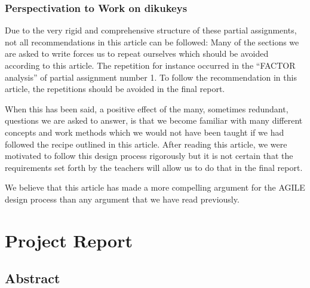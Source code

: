 \documentclass[11pt,a4paper]{report}
\begin{document}
\subsection{Perspectivation to Work on dikukeys}
Due to the very rigid and comprehensive structure of these partial assignments, not all recommendations in this article can be followed: Many of the sections we are asked to write forces us to repeat ourselves which should be avoided according to this article. The repetition for instance occurred in the ``FACTOR analysis'' of partial assignment number 1. To follow the recommendation in this article, the repetitions should be avoided in the final report.

When this has been said, a positive effect of the many, sometimes redundant, questions we are asked to answer, is that we become familiar with many different concepts and work methods which we would not have been taught if we had followed the recipe outlined in this article. After reading this article, we were motivated to follow this design process rigorously but it is not certain that the requirements set forth by the teachers will allow us to do that in the final report.

We believe that this article has made a more compelling argument for the AGILE design process than any argument that we have read previously.
\chapter{Project Report}\label{ch:Project_Report}

\section{Abstract}\label{sec:Abstract}
\end{document}
